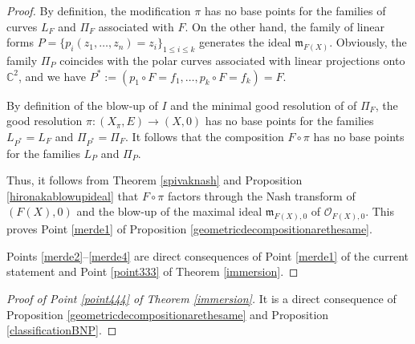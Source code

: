 \documentclass[reqno,dvipsnames,12pt]{amsart}
\newtheorem{defi}[thm]{Definition}
\begin{document}
\begin{proof}
 By definition, the modification $\pi$ has no base points for the families of curves $L_F$ and $\Pi_F$ associated with $F$. On the other hand, the family of linear forms $P=\{p_i(z_1,\dots,z_n)=z_i\}_{1 \leq i \leq k}$ generates the ideal $\mathfrak{m}_{F(X)}$. Obviously, the family $\Pi_P$ coincides with the polar curves associated with linear projections onto $\mathbb{C}^2$, and we have $P^*:=(p_1 \circ F = f_1, \dots, p_k \circ F = f_k)=F$.

By definition of the blow-up of $I$ and the minimal good resolution of of $\Pi_F$, the good resolution $\pi: (X_{\pi},E)\longrightarrow (X,0)$ has no base points for the families $L_{P^*}=L_F$ and $\Pi_{P^*}=\Pi_F$. It follows that the composition $F \circ \pi$ has no base points for the families $L_P$ and $\Pi_P$. 

Thus, it follows from Theorem \ref{spivaknash} and Proposition \ref{hironakablowupideal} that $F \circ \pi$ factors through the Nash transform of $(F(X),0)$ and the blow-up of the maximal ideal $\mathfrak{m}_{F(X),0}$ of $\mathcal{O}_{F(X),0}$. This proves Point \ref{merde1} of Proposition \ref{geometricdecompositionarethesame}. 

Points \ref{merde2}--\ref{merde4} are direct consequences of Point \ref{merde1} of the current statement and Point \ref{point333} of Theorem \ref{immersion}.
\end{proof}
  \begin{proof}[Proof of Point \ref{point444} of Theorem \ref{immersion}]
It is a direct consequence of Proposition \ref{geometricdecompositionarethesame} and Proposition \ref{classificationBNP}.


\end{proof}


 
 
 




\end{document}
